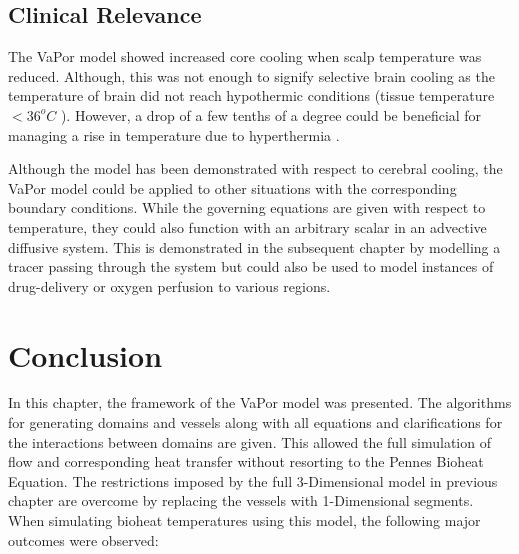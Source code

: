 \documentclass[11pt,english,a4paper,twoside,openright]{report}
\begin{document}
{{{{{{{{\subsection{Clinical Relevance}

The VaPor model showed increased core cooling when scalp temperature was reduced. Although, this was not enough to signify selective brain cooling as the temperature of brain did not reach hypothermic conditions (tissue temperature {$<$}$36^{o}C$ \cite{saigal2015targeted}). However, a drop of a few tenths of a degree could be beneficial for managing a rise in temperature due to hyperthermia \cite{mariak2002intracranial}. 

Although the model has been demonstrated with respect to cerebral cooling, the VaPor model could be applied to other situations with the corresponding boundary conditions. While the governing equations are given with respect to temperature, they could also function with an arbitrary scalar in an advective diffusive system. This is demonstrated in the subsequent chapter by modelling a tracer passing through the system but could also be used to model instances of drug-delivery or oxygen perfusion to various regions. 

\section[Conclusion]{{\Large C}onclusion}
In this chapter, the framework of the VaPor model was presented. The algorithms for generating domains and vessels along with all equations and clarifications for the interactions between domains are given. This allowed the full simulation of flow and corresponding heat transfer without resorting to the Pennes Bioheat Equation. The restrictions imposed by the full 3-Dimensional model in previous chapter are overcome by replacing the vessels with 1-Dimensional segments. When simulating bioheat temperatures using this model, the following major outcomes were observed:

}}}}}}}}
\end{document}

